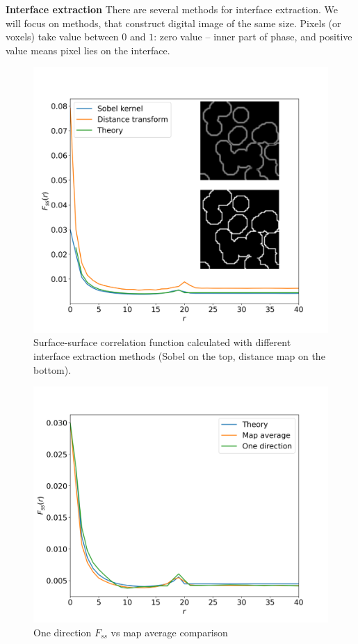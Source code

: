 \documentclass[reprint,amsmath,amssymb,aps,pre]{revtex4-1}
\begin{document}
\textbf{Interface extraction}
There are several methods for interface extraction.
We will focus on methods, that construct digital image of the same size.
Pixels (or voxels) take value between $0$ and $1$:
zero value -- inner part of phase, and positive value means pixel lies on the
interface.

\begin{figure}[ht]
  \centering
  \includegraphics[width=0.99\linewidth]{images/dm_sobel.png}
  \caption{Surface-surface correlation function calculated with different
    interface extraction methods (Sobel on the top, distance map on the
    bottom).}
  \label{fig:interface-extraction}
\end{figure}


\begin{figure}[ht]
  \centering
  \includegraphics[width=0.99\linewidth]{images/direction_and_map.png}
  \caption{One direction $F_{ss}$ vs map average comparison}
  \label{fig:direction-vs-map}
\end{figure}
\end{document}
